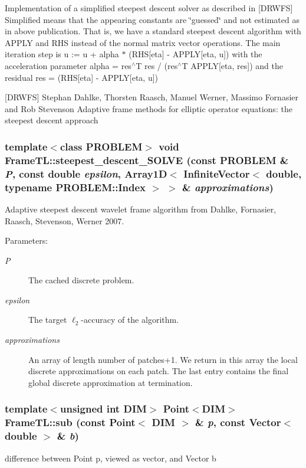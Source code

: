 Implementation of a simplified steepest descent solver as described in \mbox{[}DRWFS\mbox{]} Simplified means that the appearing constants are \char`\"{}guessed\char`\"{} and not estimated as in above publication. That is, we have a standard steepest descent algorithm with APPLY and RHS instead of the normal matrix vector operations. The main iteration step is u := u + alpha $\ast$ (RHS\mbox{[}eta\mbox{]} - APPLY\mbox{[}eta, u\mbox{]}) with the acceleration parameter alpha = res$^\wedge$T res / (res$^\wedge$T APPLY\mbox{[}eta, res\mbox{]}) and the residual res = (RHS\mbox{[}eta\mbox{]} - APPLY\mbox{[}eta, u\mbox{]})

\mbox{[}DRWFS\mbox{]} Stephan Dahlke, Thorsten Raasch, Manuel Werner, Massimo Fornasier and Rob Stevenson Adaptive frame methods for elliptic operator equations: the steepest descent approach \hypertarget{namespaceFrameTL_b98b858d0561768f9494ac7f962a6857}{
\subsubsection[steepest\_\-descent\_\-SOLVE]{\setlength{\rightskip}{0pt plus 5cm}template$<$class PROBLEM$>$ void FrameTL::steepest\_\-descent\_\-SOLVE (const PROBLEM \& {\em P}, \/  const double {\em epsilon}, \/  Array1D$<$ InfiniteVector$<$ double, typename PROBLEM::Index $>$ $>$ \& {\em approximations})}}
\label{namespaceFrameTL_b98b858d0561768f9494ac7f962a6857}


Adaptive steepest descent wavelet frame algorithm from Dahlke, Fornasier, Raasch, Stevenson, Werner 2007. 

\begin{Desc}
\item[Parameters:]
\begin{description}
\item[{\em P}]The cached discrete problem. \item[{\em epsilon}]The target $\ell_2$-accuracy of the algorithm. \item[{\em approximations}]An array of length number of patches+1. We return in this array the local discrete approximations on each patch. The last entry contains the final global discrete approximation at termination. \end{description}
\end{Desc}
\hypertarget{namespaceFrameTL_ab03f9658bfef63434301affb3b5803a}{
\subsubsection[sub]{\setlength{\rightskip}{0pt plus 5cm}template$<$unsigned int DIM$>$ Point$<$DIM$>$ FrameTL::sub (const Point$<$ DIM $>$ \& {\em p}, \/  const Vector$<$ double $>$ \& {\em b})}}
\label{namespaceFrameTL_ab03f9658bfef63434301affb3b5803a}


difference between Point p, viewed as vector, and Vector b 